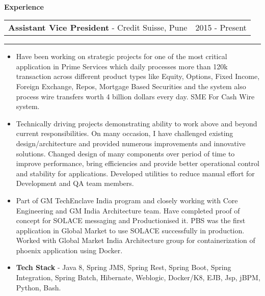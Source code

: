 \documentclass[10pt,A4]{article}
\newcommand{\cvsection}[1]
{
	\begin{center}
		\large\textcolor{sectcol}{\textbf{#1}}
	\end{center}
}
\newcommand{\cvevent}[4]
{

\begin{tabular*}{1\textwidth}{p{13.6cm}  x{3.9cm}}
	\textbf{#2} - \textcolor{bgcol}{#3} &   \vspace{2.0pt}\textcolor{sectcol}{#1}
\end{tabular*}

\vspace{-8pt}
\textcolor{softcol}{\hrule}
\vspace{6pt}

  #4 

}
\begin{document}
\ \\
%
%

\cvsection{Experience}

\cvevent{2015 - Present}
{Assistant Vice President}
{Credit Suisse, Pune}
{
\begin{itemize}

\item Have been working on strategic projects for one of the most critical application in Prime
Services which daily processes more than 120k transaction across different product types
like Equity, Options, Fixed Income, Foreign Exchange, Repos, Mortgage Based Securities 
and the system also process wire transfers worth 4 billion dollars every day. SME For Cash Wire system.	

\item Technically driving projects demonstrating ability to work above and beyond current
responsibilities. On many occasion, I have challenged existing design/architecture and provided
numerous improvements and innovative solutions. Changed design of many components
over period of time to improve performance, bring efficiencies and provide better operational
control and stability for applications. Developed utilities to reduce manual effort for
Development and QA team members.

\item Part of GM TechEnclave India program and closely working with Core Engineering and GM
India Architecture team. Have completed proof of concept for SOLACE messaging and Productionised it. 
PBS was the first application in Global Market to use SOLACE successfully in production. 
Worked with Global Market India Architecture group for containerization of phoenix application using
Docker.

\item \textbf{Tech Stack} - Java 8, Spring JMS, Spring Rest, Spring Boot, Spring Integration, Spring Batch, Hibernate, Weblogic, Docker/K8, EJB, Jsp, jBPM, Python, Bash.

\end{itemize}

}
\end{document}
